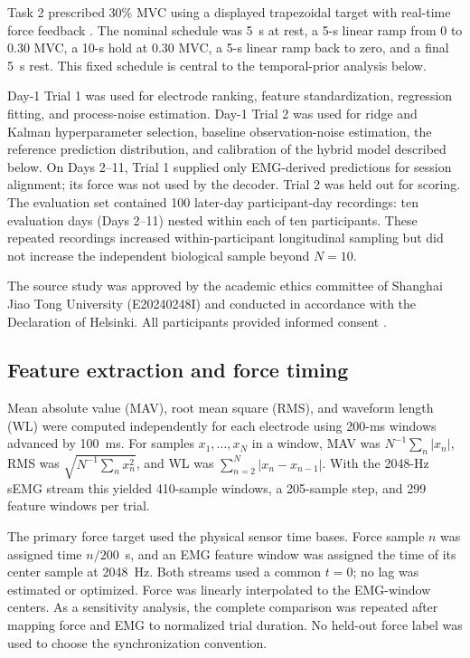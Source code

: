 \documentclass[preprint,12pt]{elsarticle}
\begin{document}
Task 2 prescribed 30\% MVC using a displayed trapezoidal target with real-time force feedback \cite{Yang2025}. The nominal schedule was 5~s at rest, a 5-s linear ramp from 0 to 0.30 MVC, a 10-s hold at 0.30 MVC, a 5-s linear ramp back to zero, and a final 5~s rest. This fixed schedule is central to the temporal-prior analysis below.

Day-1 Trial 1 was used for electrode ranking, feature standardization, regression fitting, and process-noise estimation. Day-1 Trial 2 was used for ridge and Kalman hyperparameter selection, baseline observation-noise estimation, the reference prediction distribution, and calibration of the hybrid model described below. On Days 2--11, Trial 1 supplied only EMG-derived predictions for session alignment; its force was not used by the decoder. Trial 2 was held out for scoring. The evaluation set contained 100 later-day participant-day recordings: ten evaluation days (Days 2--11) nested within each of ten participants. These repeated recordings increased within-participant longitudinal sampling but did not increase the independent biological sample beyond $N=10$.

The source study was approved by the academic ethics committee of Shanghai Jiao Tong University (E20240248I) and conducted in accordance with the Declaration of Helsinki. All participants provided informed consent \cite{Yang2025}.

\subsection{Feature extraction and force timing}

Mean absolute value (MAV), root mean square (RMS), and waveform length (WL) were computed independently for each electrode using 200-ms windows advanced by 100~ms. For samples $x_1,\ldots,x_N$ in a window, MAV was $N^{-1}\sum_n |x_n|$, RMS was $\sqrt{N^{-1}\sum_n x_n^2}$, and WL was $\sum_{n=2}^{N}|x_n-x_{n-1}|$. With the 2048-Hz sEMG stream this yielded 410-sample windows, a 205-sample step, and 299 feature windows per trial.

The primary force target used the physical sensor time bases. Force sample $n$ was assigned time $n/200$~s, and an EMG feature window was assigned the time of its center sample at 2048~Hz. Both streams used a common $t=0$; no lag was estimated or optimized. Force was linearly interpolated to the EMG-window centers. As a sensitivity analysis, the complete comparison was repeated after mapping force and EMG to normalized trial duration. No held-out force label was used to choose the synchronization convention.
\end{document}
